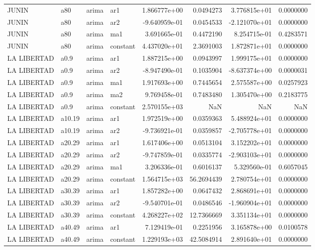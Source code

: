 \documentclass[
]{article}
\begin{document}
\begin{table}[!h]
\begin{tabular}[t]{llllrrrr}
\addlinespace
JUNIN & a80 & arima & ar1 & 1.866777e+00 & 0.0494273 & 3.776815e+01 & 0.0000000\\
JUNIN & a80 & arima & ar2 & -9.640959e-01 & 0.0454533 & -2.121070e+01 & 0.0000000\\
JUNIN & a80 & arima & ma1 & 3.691665e-01 & 0.4472190 & 8.254715e-01 & 0.4283571\\
JUNIN & a80 & arima & constant & 4.437020e+01 & 2.3691003 & 1.872871e+01 & 0.0000000\\
LA LIBERTAD & a0.9 & arima & ar1 & 1.887215e+00 & 0.0943997 & 1.999175e+01 & 0.0000000\\
\addlinespace
LA LIBERTAD & a0.9 & arima & ar2 & -8.947490e-01 & 0.1035904 & -8.637374e+00 & 0.0000031\\
LA LIBERTAD & a0.9 & arima & ma1 & 1.917693e+00 & 0.7445654 & 2.575587e+00 & 0.0257923\\
LA LIBERTAD & a0.9 & arima & ma2 & 9.769458e-01 & 0.7483480 & 1.305470e+00 & 0.2183775\\
LA LIBERTAD & a0.9 & arima & constant & 2.570155e+03 & NaN & NaN & NaN\\
LA LIBERTAD & a10.19 & arima & ar1 & 1.972519e+00 & 0.0359363 & 5.488924e+01 & 0.0000000\\
\addlinespace
LA LIBERTAD & a10.19 & arima & ar2 & -9.736921e-01 & 0.0359857 & -2.705778e+01 & 0.0000000\\
LA LIBERTAD & a20.29 & arima & ar1 & 1.617406e+00 & 0.0513104 & 3.152202e+01 & 0.0000000\\
LA LIBERTAD & a20.29 & arima & ar2 & -9.747859e-01 & 0.0335774 & -2.903103e+01 & 0.0000000\\
LA LIBERTAD & a20.29 & arima & ma1 & 3.206336e-01 & 0.6016137 & 5.329560e-01 & 0.6057045\\
LA LIBERTAD & a20.29 & arima & constant & 1.564715e+03 & 56.2694439 & 2.780754e+01 & 0.0000000\\
\addlinespace
LA LIBERTAD & a30.39 & arima & ar1 & 1.857282e+00 & 0.0647432 & 2.868691e+01 & 0.0000000\\
LA LIBERTAD & a30.39 & arima & ar2 & -9.540701e-01 & 0.0486546 & -1.960904e+01 & 0.0000000\\
LA LIBERTAD & a30.39 & arima & constant & 4.268227e+02 & 12.7366669 & 3.351134e+01 & 0.0000000\\
LA LIBERTAD & a40.49 & arima & ar1 & 7.129419e-01 & 0.2251956 & 3.165878e+00 & 0.0100578\\
LA LIBERTAD & a40.49 & arima & constant & 1.229193e+03 & 42.5084914 & 2.891640e+01 & 0.0000000\\

\end{tabular}
\end{table}
\end{document}

